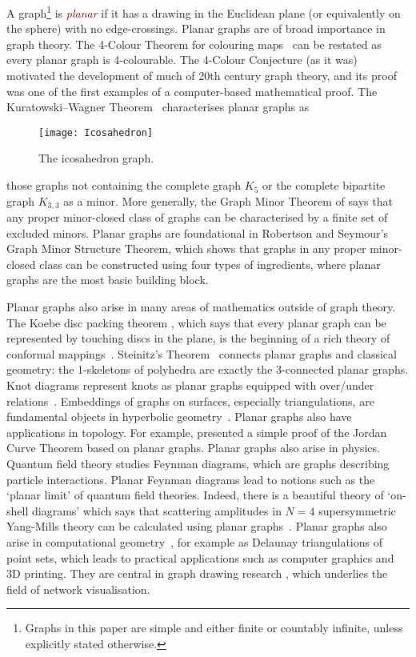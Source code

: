 \documentclass[a4paper,11pt]{article}
\newcommand{\defn}[1]{\textcolor{Maroon}{\emph{#1}}\index{#1}}
\theoremstyle{plain}
\theoremstyle{definition}
\begin{document}
A graph\footnote{Graphs in this paper are simple and either finite or countably infinite, unless explicitly stated otherwise.} is \defn{planar} if it has a drawing in the Euclidean plane (or equivalently on the sphere) with no edge-crossings. Planar graphs are of broad importance in graph theory. The 4-Colour Theorem for colouring  maps~\citep{AH89,RSST97} can be restated as every planar graph is 4-colourable. The 4-Colour Conjecture (as it was) motivated the development of much of 20th century graph theory, and its proof was one of the first examples of a computer-based mathematical proof. The Kuratowski--Wagner Theorem~\citep{Kuratowski30,Wagner37} characterises planar graphs as \begin{wrapfigure}{r}{56mm}
\centering
{\vspace*{0.2ex}\texttt{[image: Icosahedron]}\vspace*{-1.1ex}}
\caption{The icosahedron graph.}
\vspace*{-3ex}
\end{wrapfigure}
those graphs not containing the complete graph $K_5$ or the complete bipartite graph $K_{3,3}$ as a minor. More generally, the Graph Minor Theorem of \citet{RS-GraphMinors} says that any proper minor-closed class of graphs can be characterised by a finite set of excluded minors. Planar graphs are foundational in Robertson and Seymour's Graph Minor Structure Theorem, which shows that graphs in any proper minor-closed class can be constructed using four types of ingredients, where planar graphs are the most basic building block.
 
 
Planar graphs also arise in many areas of mathematics outside of graph theory. The Koebe disc packing theorem \citep{Koebe36}, which says that every planar graph can be represented by touching discs in the plane, is the beginning of a rich theory of conformal mappings~\citep{HeSc93,Stephenson05}. Steinitz's Theorem~\citep{Steinitz22} connects planar graphs and classical geometry: the 1-skeletons of polyhedra are exactly the 3-connected planar graphs. Knot diagrams represent knots as planar graphs equipped with over/under relations~\citep{CG12,KK14}. Embeddings of graphs on surfaces, especially triangulations, are fundamental objects in hyperbolic geometry~\citep{STT-JAMS88,CKP19}. Planar graphs also have applications in topology. For example, \citet{Thomassen89a,Thomassen90} presented a simple proof of  the Jordan Curve Theorem based on planar graphs. Planar graphs also arise in physics. Quantum field theory studies Feynman diagrams, which are graphs describing particle interactions. Planar Feynman diagrams \citep{MM19,BBBD15} lead to notions such as the `planar limit' of quantum field theories. Indeed, there is a beautiful theory of `on-shell diagrams' which says that scattering amplitudes in $N=4$ supersymmetric Yang-Mills theory can be calculated using planar graphs~\citep{GK16}. Planar graphs also arise in computational geometry~\citep{GOT18}, for example as Delaunay triangulations of point sets, which leads to  practical applications such as computer graphics and 3D printing. They are central in graph drawing research \citep{HandbookGraphDrawing}, which underlies the field of network visualisation. 
\end{document}
